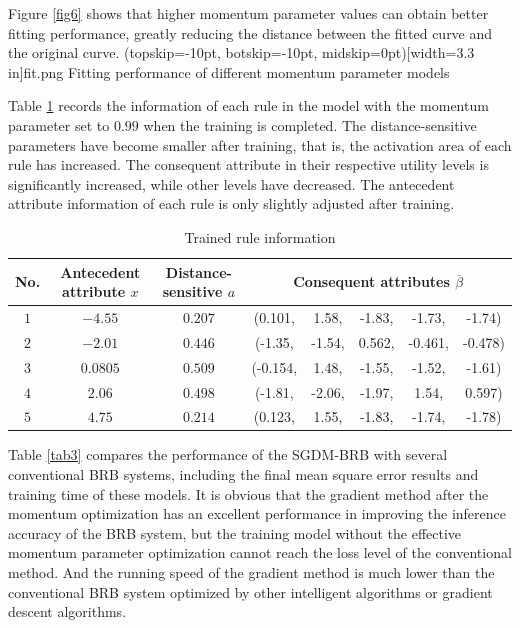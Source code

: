 \documentclass{ieeeaccess}
\begin{document}
Figure \ref{fig6} shows that higher momentum parameter values can obtain better fitting performance,
greatly reducing the distance between the fitted curve and the original curve.
\Figure[!t](topskip=-10pt, botskip=-10pt, midskip=0pt)[width=3.3 in]{fit.png}
{Fitting performance of different momentum parameter models\label{fig6}}

Table \ref{tab2} records the information of each rule in the model with the momentum parameter set to $0.99$ when the training is completed.
The distance-sensitive parameters have become smaller after training, that is, the activation area of each rule has increased.
The consequent attribute in their respective utility levels is significantly increased, while other levels have decreased.
The antecedent attribute information of each rule is only slightly adjusted after training.

\begin{table}
    \caption{Trained rule information}
    \centering
    \normalsize
    \label{tab2}
    \begin{tabular}{cccccccc}
        \hline
        No. & Antecedent attribute $x$ & Distance-sensitive $a$ & \multicolumn{5}{c}{Consequent attributes $\overline{\beta}$}                                       \\
        \hline
        $1$ & $-4.55$                  & $0.207$                & (0.101,                                                      & 1.58,  & -1.83, & -1.73,  & -1.74)  \\
        $2$ & $-2.01$                  & $0.446$                & (-1.35,                                                      & -1.54, & 0.562, & -0.461, & -0.478) \\
        $3$ & $0.0805$                 & $0.509$                & (-0.154,                                                     & 1.48,  & -1.55, & -1.52,  & -1.61)  \\
        $4$ & $2.06$                   & $0.498$                & (-1.81,                                                      & -2.06, & -1.97, & 1.54,   & 0.597)  \\
        $5$ & $4.75$                   & $0.214$                & (0.123,                                                      & 1.55,  & -1.83, & -1.74,  & -1.78)  \\
        \hline
    \end{tabular}
\end{table}

Table \ref{tab3} compares the performance of the SGDM-BRB with several conventional BRB systems,
including the final mean square error results and training time of these models.
It is obvious that the gradient method after the momentum optimization has an excellent performance in improving the inference accuracy of the BRB system,
but the training model without the effective momentum parameter optimization cannot reach the loss level of the conventional method.
And the running speed of the gradient method is much lower than the conventional BRB system optimized by other intelligent algorithms or gradient descent algorithms.
\end{document}
